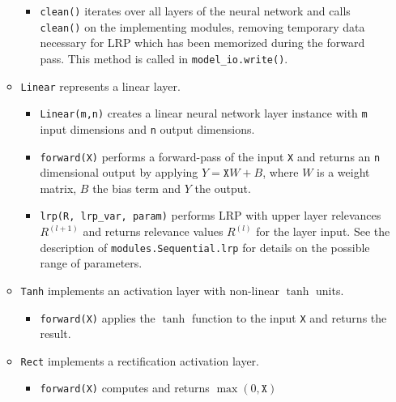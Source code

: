 \documentclass[a4wide]{article}
\begin{document}
\begin{itemize}
\begin{itemize}
\begin{itemize}
				
				\item \texttt{clean()} iterates over all layers of the neural network and calls \texttt{clean()} on the implementing modules, removing temporary data necessary for LRP	which has been memorized during the forward pass. This method is called in \texttt{model\_io.write()}. 
			\end{itemize}
			
		\item \texttt{Linear} represents a linear layer.
			\begin{itemize}
				\item \texttt{Linear(m,n)} creates a linear neural network layer instance with \texttt{m} input dimensions and \texttt{n} output dimensions.
				
				\item \texttt{forward(X)} performs a forward-pass of the input \texttt{X} and returns an \texttt{n} dimensional output by applying $Y  = \texttt{X}W + B$, where $W$ is a weight matrix, $B$ the bias term and $Y$ the output.
								
				\item \texttt{lrp(R, lrp\_var, param)} performs LRP with upper layer relevances $R^{(l+1)}$ and returns relevance values $R^{(l)}$ for the layer input. See the description of \texttt{modules.Sequential.lrp} for details on the possible range of parameters.
				
			\end{itemize}
		\item \texttt{Tanh} implements an activation layer with non-linear $\tanh$ units.
			\begin{itemize}
				\item \texttt{forward(X)} applies the $\tanh$ function to the input \texttt{X} and returns the result.
			\end{itemize}	
				
		\item \texttt{Rect} implements a rectification activation layer.
			\begin{itemize}
				\item \texttt{forward(X)} computes and returns $\max(0,\texttt{X})$
			\end{itemize}	
				

\end{itemize}
\end{itemize}
\end{document}

